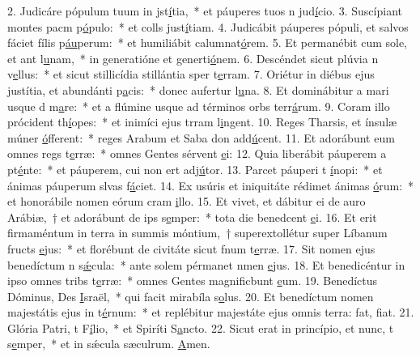 2. Judicáre pópulum tuum in jst\uline{í}tia,~* et páuperes tuos n jud\uline{í}cio.
3. Suscípiant montes pacm p\uline{ó}pulo:~* et colls just\uline{í}tiam.
4. Judicábit páuperes pópuli, et salvos fáciet fílis p\uline{áu}perum:~* et humiliábit calumnat\uline{ó}rem.
5. Et permanébit cum sole, et ant l\uline{u}nam,~* in generatióne et generti\uline{ó}nem.
6. Descéndet sicut plúvia n v\uline{e}llus:~* et sicut stillicídia stillántia sper t\uline{e}rram.
7. Oriétur in diébus ejus justítia, et abundánti p\uline{a}cis:~* donec aufertur l\uline{u}na.
8. Et dominábitur a mari usque d m\uline{a}re:~* et a flúmine usque ad términos orbs terr\uline{á}rum.
9. Coram illo prócident th\uline{í}opes:~* et inimíci ejus trram l\uline{i}ngent.
10. Reges Tharsis, et ínsulæ múner \uline{ó}fferent:~* reges Arabum et Saba don add\uline{ú}cent.
11. Et adorábunt eum omnes regs t\uline{e}rræ:~* omnes Gentes sérvent \uline{e}i:
12. Quia liberábit páuperem a pt\uline{é}nte:~* et páuperem, cui non ert adj\uline{ú}tor.
13. Parcet páuperi t \uline{í}nopi:~* et ánimas páuperum slvas f\uline{á}ciet.
14. Ex usúris et iniquitáte rédimet ánimas \uline{ó}rum:~* et honorábile nomen eórum cram \uline{i}llo.
15. Et vivet, et dábitur ei de auro Arábiæ,~† et adorábunt de ips s\uline{e}mper:~* tota die benedcent \uline{e}i.
16. Et erit firmaméntum in terra in summis móntium,~† superextollétur super Líbanum fructs \uline{e}jus:~* et florébunt de civitáte sicut fnum t\uline{e}rræ.
17. Sit nomen ejus benedíctum n s\uline{ǽ}cula:~* ante solem pérmanet nmen \uline{e}jus.
18. Et benedicéntur in ipso omnes tribs t\uline{e}rræ:~* omnes Gentes magnificbunt \uline{e}um.
19. Benedíctus Dóminus, Des \uline{I}sraël,~* qui facit mirabíla s\uline{o}lus.
20. Et benedíctum nomen majestátis ejus in t\uline{é}rnum:~* et replébitur majestáte ejus omnis terra: fat, f\uline{i}at.
21. Glória Patri, t F\uline{í}lio,~* et Spiríti S\uline{a}ncto.
22. Sicut erat in princípio, et nunc, t s\uline{e}mper,~* et in sǽcula sæculrum. \uline{A}men.
